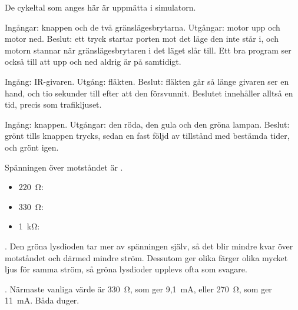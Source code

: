 %


De cykeltal som anges här är uppmätta i simulatorn.

Ingångar: knappen och de två gränslägesbrytarna. Utgångar: motor upp och motor ned. Beslut:
ett tryck startar porten mot det läge den inte står i, och motorn stannar när gränslägesbrytaren i
det läget slår till. Ett bra program ser också till att upp och ned aldrig är på samtidigt.

Ingång: IR-givaren. Utgång: fläkten. Beslut: fläkten går så länge givaren ser en hand, och
tio sekunder till efter att den försvunnit. Beslutet innehåller alltså en tid, precis som
trafikljuset.

Ingång: knappen. Utgångar: den röda, den gula och den gröna lampan. Beslut: grönt tills
knappen trycks, sedan en fast följd av tillstånd med bestämda tider, och grönt igen.

Spänningen över motståndet är .
\begin{itemize}
  \item 220~Ω: 
  \item 330~Ω: 
  \item 1~kΩ: 
\end{itemize}

. Den gröna lysdioden tar mer av spänningen själv, så det blir
mindre kvar över motståndet och därmed mindre ström. Dessutom ger olika färger olika mycket ljus
för samma ström, så gröna lysdioder upplevs ofta som svagare.

. Närmaste vanliga värde är 330~Ω, som ger 9,1~mA, eller
270~Ω, som ger 11~mA. Båda duger.

